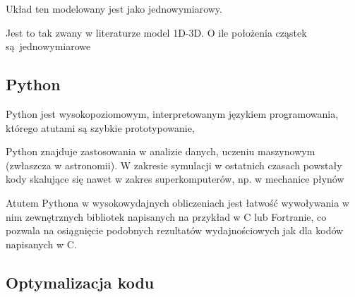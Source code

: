 Układ ten modelowany jest jako jednowymiarowy.

Jest to tak zwany w literaturze model 1D-3D. O ile położenia cząstek są jednowymiarowe


\subsection{Python}
Python jest wysokopoziomowym, interpretowanym językiem programowania, którego atutami są szybkie prototypowanie,

Python znajduje zastosowania w analizie danych, uczeniu maszynowym (zwłaszcza w astronomii). W zakresie symulacji
w ostatnich czasach powstały kody skalujące się nawet w zakres superkomputerów, np. w mechanice płynów %

Atutem Pythona w wysokowydajnych obliczeniach jest łatwość wywoływania w nim zewnętrznych bibliotek napisanych
na przykład w C lub Fortranie, co pozwala na osiągnięcie podobnych rezultatów wydajnościowych jak dla kodów
napisanych w C.

\subsection{Optymalizacja kodu}
